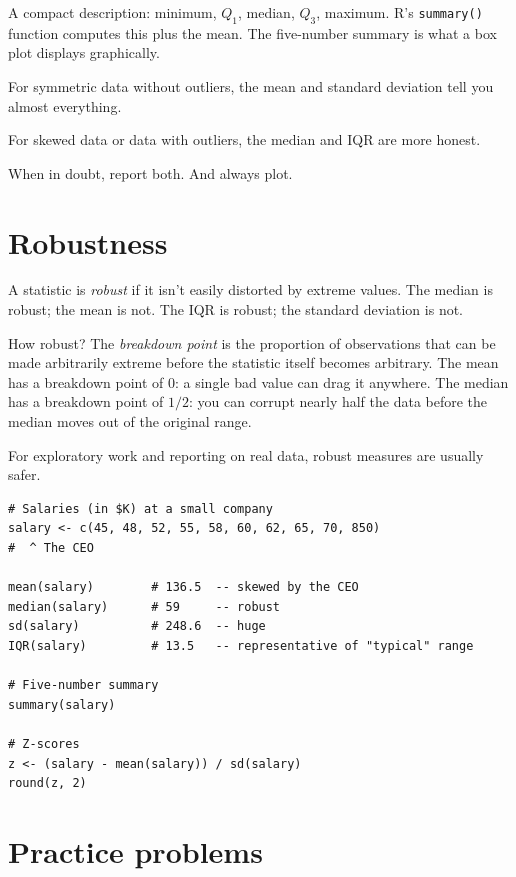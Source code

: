 A compact description: minimum, $Q_1$, median, $Q_3$, maximum. R's \texttt{summary()} function computes this plus the mean. The five-number summary is what a box plot displays graphically.

\begin{keyinsight}
For symmetric data without outliers, the mean and standard deviation tell you almost everything.

For skewed data or data with outliers, the median and IQR are more honest.

When in doubt, report both. And always plot.
\end{keyinsight}

\section{Robustness}

A statistic is \emph{robust} if it isn't easily distorted by extreme values. The median is robust; the mean is not. The IQR is robust; the standard deviation is not.

How robust? The \emph{breakdown point} is the proportion of observations that can be made arbitrarily extreme before the statistic itself becomes arbitrary. The mean has a breakdown point of $0$: a single bad value can drag it anywhere. The median has a breakdown point of $1/2$: you can corrupt nearly half the data before the median moves out of the original range.

For exploratory work and reporting on real data, robust measures are usually safer.

\begin{codelab}
\begin{lstlisting}[language=Rlang]
# Salaries (in $K) at a small company
salary <- c(45, 48, 52, 55, 58, 60, 62, 65, 70, 850)
#  ^ The CEO

mean(salary)        # 136.5  -- skewed by the CEO
median(salary)      # 59     -- robust
sd(salary)          # 248.6  -- huge
IQR(salary)         # 13.5   -- representative of "typical" range

# Five-number summary
summary(salary)

# Z-scores
z <- (salary - mean(salary)) / sd(salary)
round(z, 2)
\end{lstlisting}
\end{codelab}

\section{Practice problems}

